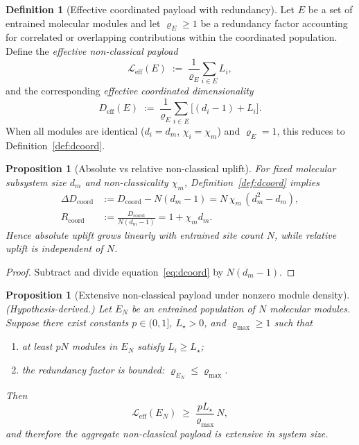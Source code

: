 \documentclass[12pt,a4paper]{article}
\newtheorem{proposition}[theorem]{Proposition}
\theoremstyle{definition}
\newtheorem{definition}[theorem]{Definition}
\theoremstyle{remark}
\begin{document}
\begin{definition}[Effective coordinated payload with redundancy]
\label{def:effective-payload}
Let $E$ be a set of entrained molecular modules and let $\varrho_E \geq 1$ be a redundancy factor accounting for correlated or overlapping contributions within the coordinated population. Define the \emph{effective non-classical payload}
\begin{equation}
\label{eq:effective-payload}
\mathcal{L}_{\mathrm{eff}}(E) \;:=\; \frac{1}{\varrho_E}\sum_{i \in E} L_i,
\end{equation}
and the corresponding \emph{effective coordinated dimensionality}
\begin{equation}
\label{eq:effective-dcoord}
D_{\mathrm{eff}}(E) \;:=\; \frac{1}{\varrho_E}\sum_{i \in E}\bigl[(d_i - 1) + L_i\bigr].
\end{equation}
When all modules are identical ($d_i = d_m$, $\chi_i = \chi_m$) and $\varrho_E = 1$, this reduces to Definition~\ref{def:dcoord}.
\end{definition}

\begin{proposition}[Absolute vs relative non-classical uplift]
\label{prop:absolute-relative}
For fixed molecular subsystem size $d_m$ and non-classicality $\chi_m$, Definition~\ref{def:dcoord} implies
\begin{align}
\Delta D_{\mathrm{coord}}
&:= D_{\mathrm{coord}} - N(d_m-1)
= N\,\chi_m\,(d_m^2-d_m), \label{eq:delta-dcoord}\\
R_{\mathrm{coord}}
&:= \frac{D_{\mathrm{coord}}}{N(d_m-1)}
= 1 + \chi_m d_m. \label{eq:relative-dcoord}
\end{align}
Hence absolute uplift grows linearly with entrained site count $N$, while relative uplift is independent of $N$.
\end{proposition}

\begin{proof}
Subtract and divide equation~\eqref{eq:dcoord} by $N(d_m-1)$.
\end{proof}

\begin{proposition}[Extensive non-classical payload under nonzero module density]
\label{prop:extensive-payload}
\emph{(Hypothesis-derived.)} Let $E_N$ be an entrained population of $N$ molecular modules. Suppose there exist constants $p \in (0,1]$, $L_\star > 0$, and $\varrho_{\max} \geq 1$ such that
\begin{enumerate}
\item[\emph{(i)}] at least $pN$ modules in $E_N$ satisfy $L_i \geq L_\star$;
\item[\emph{(ii)}] the redundancy factor is bounded: $\varrho_{E_N} \leq \varrho_{\max}$.
\end{enumerate}
Then
\begin{equation}
\label{eq:extensive-payload}
\mathcal{L}_{\mathrm{eff}}(E_N) \;\geq\; \frac{pL_\star}{\varrho_{\max}}\,N,
\end{equation}
and therefore the aggregate non-classical payload is extensive in system size.
\end{proposition}
\end{document}
